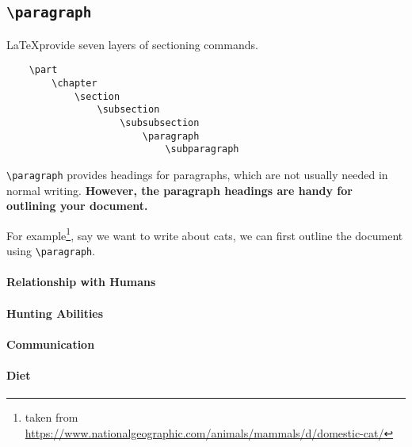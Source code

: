 \documentclass[a4paper,12pt]{article}
\begin{document}
\subsection{\texttt{\textbackslash paragraph}}
\LaTeX provide seven layers of sectioning commands.
\begin{tcolorbox}
\begin{verbatim}
    \part
        \chapter
            \section
                \subsection
                    \subsubsection
                        \paragraph
                            \subparagraph
\end{verbatim}
\end{tcolorbox}


\verb|\paragraph| provides headings for paragraphs, which are not usually needed in normal writing. \textbf{However, the paragraph headings are handy for outlining your document.}

For example\footnote{taken from \url{https://www.nationalgeographic.com/animals/mammals/d/domestic-cat/}}, say we want to write about cats, we can first outline the document using \verb|\paragraph|.

\begin{tcolorbox}[parbox=false]
    \paragraph{Relationship with Humans}
    \paragraph{Hunting Abilities}
    \paragraph{Communication}
    \paragraph{Diet}
\end{tcolorbox}
\end{document}
